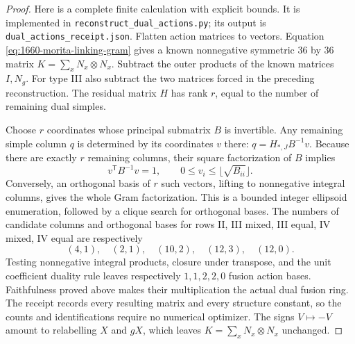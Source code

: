 \begin{proof}
Here is a complete finite calculation with explicit bounds. It is
implemented in \texttt{reconstruct\_dual\_actions.py}; its output is
\texttt{dual\_actions\_receipt.json}. Flatten action matrices to vectors.
Equation \eqref{eq:1660-morita-linking-gram} gives a known nonnegative symmetric $36$ by $36$ matrix
$K=\sum_x N_x\otimes N_x$. Subtract the outer products of the known
matrices $I,N_g$. For type III also subtract the two matrices forced in
the preceding reconstruction. The residual matrix $H$ has rank $r$,
equal to the number of remaining dual simples.

Choose $r$ coordinates whose principal submatrix $B$ is invertible.
Any remaining simple column $q$ is determined by its coordinates $v$
there: $q=H_{*,J}B^{-1}v$. Because there are exactly $r$ remaining
columns, their square factorization of $B$ implies
\[
v^{\mathsf T}B^{-1}v=1,
\qquad 0\leq v_i\leq\lfloor\sqrt{B_{ii}}\rfloor.
\]
Conversely, an orthogonal basis of $r$ such vectors, lifting to
nonnegative integral columns, gives the whole Gram factorization.
This is a bounded integer ellipsoid enumeration, followed by a clique
search for orthogonal bases. The numbers of candidate columns and
orthogonal bases for rows II, III mixed, III equal, IV mixed, IV equal
are respectively
\[
(4,1),\quad(2,1),\quad(10,2),\quad(12,3),\quad(12,0).
\]
Testing nonnegative integral products, closure under transpose, and the
unit coefficient duality rule leaves respectively $1,1,2,2,0$ fusion
action bases. Faithfulness proved above makes their multiplication the
actual dual fusion ring. The receipt records every resulting matrix
and every structure constant, so the counts and identifications require
no numerical optimizer. The signs $V\mapsto -V$ amount to relabelling
$X$ and $gX$, which leaves $K=\sum_xN_x\otimes N_x$ unchanged.
\end{proof}

